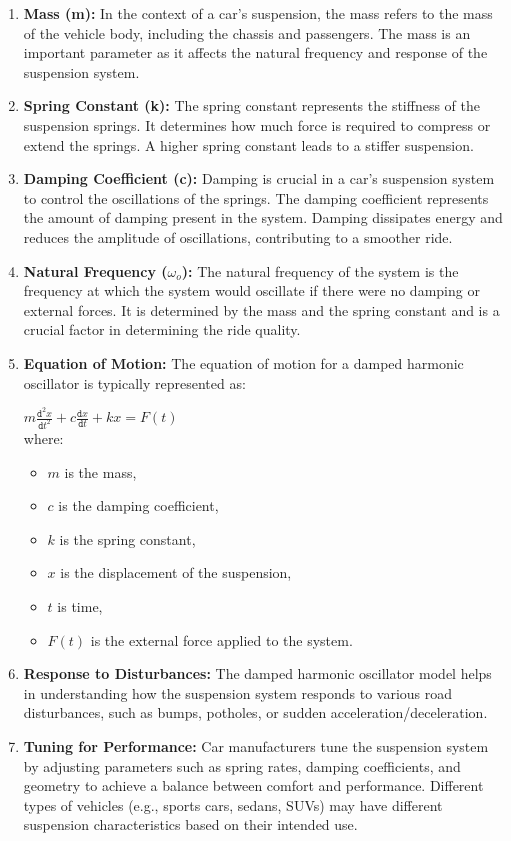 \documentclass{article}
\begin{document}
\begin{enumerate}
    \item \textbf{Mass (m):} In the context of a car's suspension, the mass refers to the mass of the vehicle body, including the chassis and passengers. The mass is an important parameter as it affects the natural frequency and response of the suspension system.
    \item \textbf{Spring Constant (k):} The spring constant represents the stiffness of the suspension springs. It determines how much force is required to compress or extend the springs. A higher spring constant leads to a stiffer suspension.
    \item \textbf{Damping Coefficient (c):} Damping is crucial in a car's suspension system to control the oscillations of the springs. The damping coefficient represents the amount of damping present in the system. Damping dissipates energy and reduces the amplitude of oscillations, contributing to a smoother ride.
    \item \textbf{Natural Frequency ($\omega_o$):} The natural frequency of the system is the frequency at which the system would oscillate if there were no damping or external forces. It is determined by the mass and the spring constant and is a crucial factor in determining the ride quality.
    \item \textbf{Equation of Motion:} The equation of motion for a damped harmonic oscillator is typically represented as: \newline

    $m\frac{\texttt{d}^2x}{\texttt{d}t^2}+c\frac{\texttt{d}x}{\texttt{d}t}+kx=F(t)$\\

    where:
    \begin{itemize}[label=$\circ$]
            \item $m$ is the mass,
            \item $c$ is the damping coefficient,
            \item $k$ is the spring constant,
            \item $x$ is the displacement of the suspension,
            \item $t$ is time,
            \item $F(t)$ is the external force applied to the system.    
    \end{itemize}
    \item \textbf{Response to Disturbances:} The damped harmonic oscillator model helps in understanding how the suspension system responds to various road disturbances, such as bumps, potholes, or sudden acceleration/deceleration.
    \item \textbf{Tuning for Performance:} Car manufacturers tune the suspension system by adjusting parameters such as spring rates, damping coefficients, and geometry to achieve a balance between comfort and performance. Different types of vehicles (e.g., sports cars, sedans, SUVs) may have different suspension characteristics based on their intended use.\\


\end{enumerate}
\end{document}
